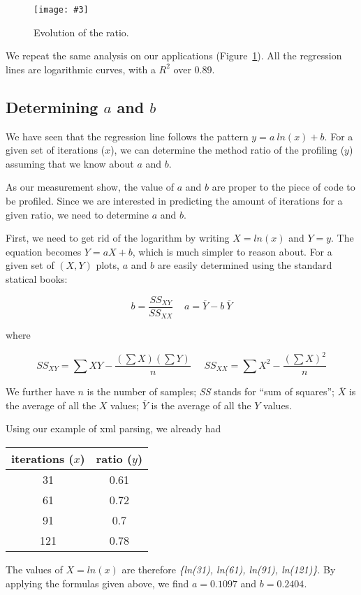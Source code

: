 \documentclass{sig-alternate}
\newcommand{\fig}[4]{
	\begin{figure}[#1]
		\centering
		\texttt{[image: \#3]}
		\caption{\label{fig:#3}#4}
	\end{figure}}
\newcommand{\figref}[1]{Figure~\ref{fig:#1}}
\begin{document}
\fig{h}{0.5}{IterationEvolutionForApplications}{Evolution of the ratio.}
We repeat the same analysis on our applications (\figref{IterationEvolutionForApplications}). All the regression lines are logarithmic curves, with a $R^2$ over 0.89. 

\subsection{Determining $a$ and $b$}

We have seen that the regression line follows the pattern $y = a~ln(x) + b$. For a given set of iterations ($x$), we can determine the method ratio of the profiling ($y$) assuming that we know about $a$ and $b$. 

As our measurement show, the value of $a$ and $b$ are proper to the piece of code to be profiled. Since we are interested in predicting the amount of iterations for a given ratio, we need to determine $a$ and $b$. 

First, we need to get rid of the logarithm by writing $X = ln(x)$ and $Y = y$. The equation becomes $Y = a X + b$, which is much simpler to reason about. For a given set of $(X, Y)$ plots, $a$ and $b$ are easily determined using the standard statical books:

\[
b = \frac{SS_{XY}}{SS_{XX}} ~~~~~ a = \overline{Y} - b~\overline{Y}
\]

where 

\[
\textit{SS}_{XY} = \sum XY - \frac{(\sum X)(\sum Y)}{n}~~~~~~\textit{SS}_{XX} = \sum X^2 - \frac{(\sum X)^2}{n}
\]

We further have $n$ is the number of samples; 
\textit{SS} stands for ``sum of squares'';
$\overline{X}$ is the average of all the $X$ values;
$\overline{Y}$ is the average of all the $Y$ values.

Using our example of xml parsing, we already had 

\begin{center}
\begin{tabular}{|c|c|}
\hline
iterations ($x$) & ratio ($y$) \\\hline
31		& 0.61 \\
61		& 0.72\\
91		& 0.7\\
121		& 0.78\\
\hline
\end{tabular}
\end{center}

The values of $X = ln(x)$ are therefore \textit{\{ln(31), ln(61), ln(91), ln(121)\}}.
By applying the formulas given above, we find $a = 0.1097$ and $b = 0.2404$. 
\end{document}
